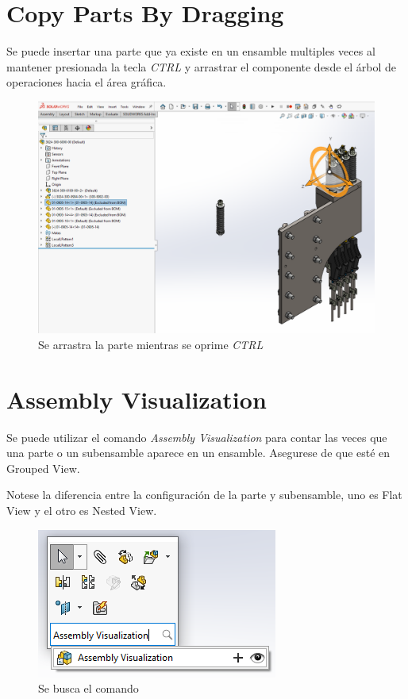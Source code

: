 \documentclass[12pt,letterpaper,final]{report}
\begin{document}
\chapter{Copy Parts By Dragging}

Se puede insertar una parte que ya existe en un ensamble multiples veces al mantener presionada la tecla \emph{CTRL} y arrastrar el componente desde el árbol de operaciones hacia el área gráfica.

\begin{figure}[H]
	\centering
	\includegraphics[width=0.85\linewidth, height=0.5\textheight,keepaspectratio]{Imagenes/solidworks_copiarconctrl01}
	\caption{Se arrastra la parte mientras se oprime \emph{CTRL}}
	\label{fig:solidworkscopiarconctrl01}
\end{figure}

\chapter{Assembly Visualization}

Se puede utilizar el comando \emph{Assembly Visualization} para contar las veces que una parte o un subensamble aparece en un ensamble. Asegurese de que esté en Grouped View.

Notese la diferencia entre la configuración de la parte y subensamble, uno es Flat View y el otro es Nested View.

\begin{figure}[H]
	\centering
	\includegraphics[width=0.65\linewidth, height=0.45\textheight,keepaspectratio]{Imagenes/solidworks_assemblyvisualization01}
	\caption{Se busca el comando}
	\label{fig:solidworksassemblyvisualization01}
\end{figure}
\end{document}
